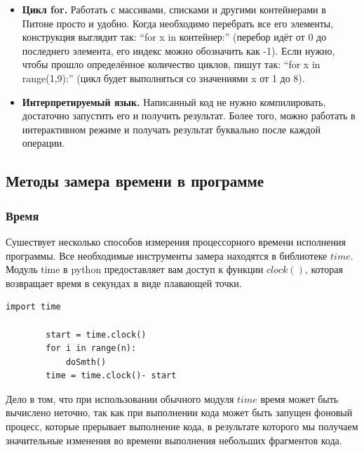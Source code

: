 \documentclass[a4paper]{article}
\begin{document}
\begin{itemize}
		\item {\bf Цикл for.} Работать с массивами, списками и другими контейнерами в Питоне просто и удобно. Когда необходимо перебрать все его элементы, конструкция выглядит так: “for x in контейнер:” (перебор идёт от 0 до последнего элемента, его индекс можно обозначить как  -1). Если нужно, чтобы прошло определённое количество циклов, пишут так: “for x in range(1,9):” (цикл будет выполняться со значениями x от 1 до 8).
		\item {\bf Интерпретируемый язык.} Написанный код не нужно компилировать, достаточно запустить его и получить результат. Более того, можно работать в интерактивном режиме и получать результат буквально после каждой операции.
	\end{itemize}
	\clearpage

	\subsection{Методы замера времени в программе}
	\subsubsection{Время}
	
	Сушествует несколько способов измерения процессорного времени исполнения программы. 
	Все необходимые инструменты замера находятся в библиотеке $time$. 	Модуль time в python предоставляет вам доступ к функции $clock()$, которая возвращает время в секундах в виде плавающей точки.
		\begin{lstlisting}[label=time1,caption=Измерение процессорного времени модулем time.clock()]
		import time
		
		start = time.clock()
		for i in range(n):
			doSmth()
		time = time.clock()- start	
	\end{lstlisting}

 Дело в том, что при использовании обычного модуля $time$ время может быть вычислено неточно, так как при выполнении	кода может быть запущен фоновый процесс, которые прерывает выполнение кода, в результате которого мы получаем значительные изменения во времени выполнения небольших фрагментов кода.
\end{document}
